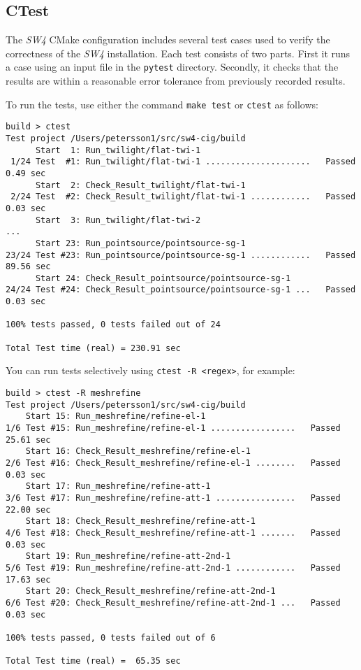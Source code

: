 \documentclass[11pt]{article}
\begin{document}
\subsection{CTest}\label{cha:ctest-sw4}
The \emph{SW4} CMake configuration includes several test cases used to verify the correctness
of the \emph{SW4} installation.  Each test consists of two parts. First it runs a case using an input
file in the \verb+pytest+ directory. Secondly, it checks that the results are within
a reasonable error tolerance from previously recorded results.

To run the tests, use either the command \texttt{make test} or \texttt{ctest} as follows:
%
\begin{verbatim}
build > ctest
Test project /Users/petersson1/src/sw4-cig/build
      Start  1: Run_twilight/flat-twi-1
 1/24 Test  #1: Run_twilight/flat-twi-1 .....................   Passed    0.49 sec
      Start  2: Check_Result_twilight/flat-twi-1
 2/24 Test  #2: Check_Result_twilight/flat-twi-1 ............   Passed    0.03 sec
      Start  3: Run_twilight/flat-twi-2
...
      Start 23: Run_pointsource/pointsource-sg-1
23/24 Test #23: Run_pointsource/pointsource-sg-1 ............   Passed   89.56 sec
      Start 24: Check_Result_pointsource/pointsource-sg-1
24/24 Test #24: Check_Result_pointsource/pointsource-sg-1 ...   Passed    0.03 sec

100% tests passed, 0 tests failed out of 24

Total Test time (real) = 230.91 sec
\end{verbatim}

You can run tests selectively using \texttt{ctest -R \textless regex\textgreater}, for example:
%
\begin{verbatim}
build > ctest -R meshrefine
Test project /Users/petersson1/src/sw4-cig/build
    Start 15: Run_meshrefine/refine-el-1
1/6 Test #15: Run_meshrefine/refine-el-1 .................   Passed   25.61 sec
    Start 16: Check_Result_meshrefine/refine-el-1
2/6 Test #16: Check_Result_meshrefine/refine-el-1 ........   Passed    0.03 sec
    Start 17: Run_meshrefine/refine-att-1
3/6 Test #17: Run_meshrefine/refine-att-1 ................   Passed   22.00 sec
    Start 18: Check_Result_meshrefine/refine-att-1
4/6 Test #18: Check_Result_meshrefine/refine-att-1 .......   Passed    0.03 sec
    Start 19: Run_meshrefine/refine-att-2nd-1
5/6 Test #19: Run_meshrefine/refine-att-2nd-1 ............   Passed   17.63 sec
    Start 20: Check_Result_meshrefine/refine-att-2nd-1
6/6 Test #20: Check_Result_meshrefine/refine-att-2nd-1 ...   Passed    0.03 sec

100% tests passed, 0 tests failed out of 6

Total Test time (real) =  65.35 sec
\end{verbatim}
\end{document}
